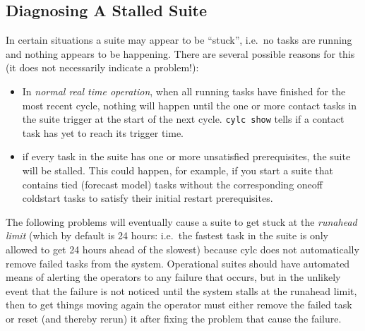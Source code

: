 \documentclass[11pt,a4paper]{article}
\begin{document}
\subsection{Diagnosing A Stalled Suite}
\label{DiagnosingAStalledSuite}

In certain situations a suite may appear to be ``stuck'', i.e.\ no
tasks are running and nothing appears to be happening. There are several 
possible reasons for this (it does not necessarily indicate a problem!):

\begin{itemize}
    \item In {\em normal real time operation}, when all running tasks
        have finished for the most recent cycle, nothing will happen
        until the one or more contact tasks in the suite trigger at the
        start of the next cycle. \lstinline=cylc show= tells if a
        contact task has yet to reach its trigger time.

    \item if every task in the suite has one or more unsatisfied
        prerequisites, the suite will be stalled. This could happen,
        for example, if you start a suite that contains tied (forecast
        model) tasks without the corresponding oneoff coldstart tasks to
        satisfy their initial restart prerequisites.

\end{itemize}

The following problems will eventually cause a suite to get stuck at
the {\em runahead limit} (which by default is 24 hours: i.e.\ the
fastest task in the suite is only allowed to get 24 hours ahead of the
slowest) because cylc does not automatically remove failed tasks from
the system.  Operational suites should have automated means of
alerting the operators to any failure that occurs, but in the
unlikely event that the failure is not noticed until the system stalls
at the runahead limit, then to get things moving again the operator must
either remove the failed task or reset (and thereby rerun) it after
fixing the problem that cause the failure.
\end{document}
